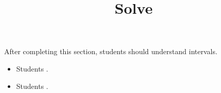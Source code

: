 \documentclass{ximera}
\title{Solve}
\begin{document}
\begin{abstract}
\end{abstract}

\maketitle

\begin{sectionOutcomes}

After completing this section, students should understand intervals. 

\begin{itemize}
\item Students .
\item Students .
\end{itemize}

\end{sectionOutcomes}
\end{document}
